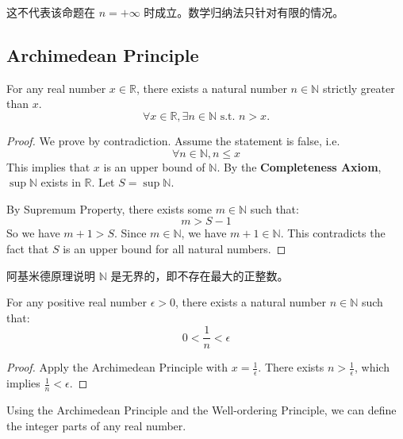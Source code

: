 \documentclass[
	UTF-8,
	11pt, %
	a4paper, %
]{LegrandOrangeBook}
\begin{document}
    \begin{remark}
        这不代表该命题在 $n=+\infty$ 时成立。数学归纳法只针对有限的情况。
    \end{remark}

    \newpage

    \subsection{Archimedean Principle}

    
    \begin{theorem}
    For any real number $x \in \mathbb{R}$, there exists a natural number $n \in \mathbb{N}$ strictly greater than $x$.
    \[ \forall x \in \mathbb{R}, \exists n \in \mathbb{N} \text{ s.t. } n > x. \]
    \end{theorem}

    \begin{proof}
    We prove by contradiction.
    Assume the statement is false, i.e.
    $$\forall n \in \mathbb{N}, n \le x$$
    This implies that $x$ is an upper bound of $\mathbb{N}$. By the \textbf{Completeness Axiom}, $\sup \mathbb{N}$ exists in $\mathbb{R}$. Let $S = \sup \mathbb{N}$.

    By Supremum Property, there exists some $m \in \mathbb{N}$ such that:
    \[ m > S - 1 \]
    So we have $m + 1 > S$.
    Since $m \in \mathbb{N}$, we have $m+1 \in \mathbb{N}$. This contradicts the fact that $S$ is an upper bound for all natural numbers.
    \end{proof}

    \begin{remark}
        阿基米德原理说明 $\mathbb{N}$ 是无界的，即不存在最大的正整数。
    \end{remark}

    \begin{corollary}
    For any positive real number $\epsilon > 0$, there exists a natural number $n \in \mathbb{N}$ such that:
    \[ 0 < \frac{1}{n} < \epsilon \]
    \end{corollary}

    \begin{proof}
        Apply the Archimedean Principle with $x = \frac{1}{\epsilon}$. 
        There exists $n > \frac{1}{\epsilon}$, which implies $\frac{1}{n} < \epsilon$.
    \end{proof}

    Using the Archimedean Principle and the Well-ordering Principle, we can define the integer parts of any real number.
\end{document}
